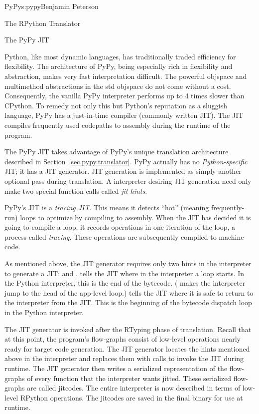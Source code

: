 \begin{aosachapter}{PyPy}{s:pypy}{Benjamin Peterson}
\begin{aosasect1}{The RPython Translator}
\end{aosasect1}

\begin{aosasect1}{The PyPy JIT}
\label{sec.pypy.jit}

Python, like most dynamic languages, has traditionally traded efficiency for
flexibility. The architecture of PyPy, being especially rich in flexibility and
abstraction, makes very fast interpretation difficult. The powerful objspace and
multimethod abstractions in the std objspace do not come without a
cost. Consequently, the vanilla PyPy interpreter performs up to 4 times slower
than CPython. To remedy not only this but Python's reputation as a sluggish
language, PyPy has a just-in-time compiler (commonly written JIT). The JIT
compiles frequently used codepaths to assembly during the runtime of the
program.

The PyPy JIT takes advantage of PyPy's unique translation architecture described in
Section~\ref{sec.pypy.translator}. PyPy actually has no \emph{Python-specific} JIT;
it has a JIT generator. JIT generation is implemented as simply another optional
pass during translation. A interpreter desiring JIT generation need only make
two special function calls called \emph{jit hints}.

PyPy's JIT is a \emph{tracing JIT}. This means it detects ``hot'' (meaning
frequently-run) loops to optimize by compiling to assembly. When the JIT has
decided it is going to compile a loop, it records operations in one iteration of
the loop, a process called \emph{tracing}. These operations are subsequently
compiled to machine code.

As mentioned above, the JIT generator requires only two hints in the interpreter
to generate a JIT:  and
.  tells the JIT where in the
interpreter a loop starts. In the Python interpreter, this is the end of the
 bytecode. ( makes the interpreter jump
to the head of the app-level loop.)  tells the JIT where it is
safe to return to the interpreter from the JIT. This is the beginning of the
bytecode dispatch loop in the Python interpreter.

The JIT generator is invoked after the RTyping phase of translation. Recall that
at this point, the program's flow-graphs consist of low-level operations nearly
ready for target code generation. The JIT generator locates the hints mentioned
above in the interpreter and replaces them with calls to invoke the JIT during
runtime. The JIT generator then writes a serialized representation of the
flow-graphs of every function that the interpreter wants jitted. These
serialized flow-graphs are called jitcodes. The entire interpreter is now
described in terms of low-level RPython operations. The jitcodes are saved in
the final binary for use at runtime.


\end{aosasect1}
\end{aosachapter}
